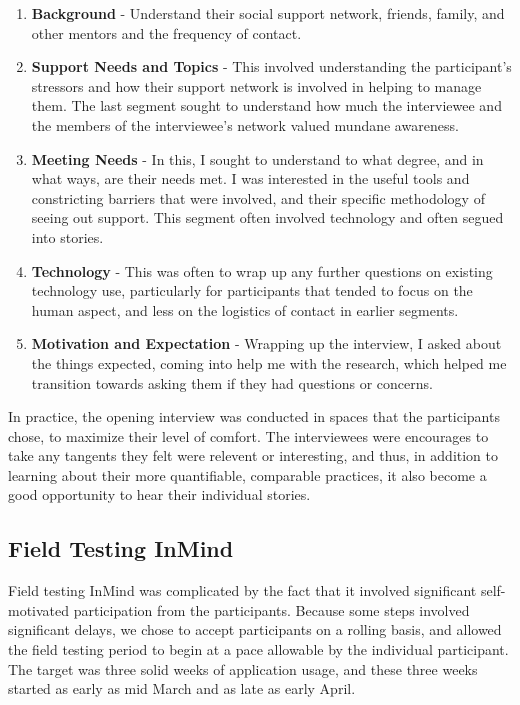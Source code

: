   \begin{enumerate}
  \item \textbf{Background} -
    Understand their social support network,
    friends, family, and other mentors and the frequency of contact.

  \item \textbf{Support Needs and Topics} -
    This involved understanding the participant's stressors and how their
    support network is involved in helping to manage them.
    The last segment sought to understand how much the interviewee
    and the members of the interviewee's network valued
    mundane awareness.

  \item \textbf{Meeting Needs} -
    In this, I sought to understand to what degree,
    and in what ways, are their needs met.
    I was interested in the useful tools and constricting barriers
    that were involved,
    and their specific methodology of seeing out support.
    This segment often involved technology and often segued into stories.

  \item \textbf{Technology} -
    This was often to wrap up any further questions on existing technology use,
    particularly for participants that tended to focus on the human aspect,
    and less on the logistics of contact in earlier segments.

  \item \textbf{Motivation and Expectation} - 
    Wrapping up the interview, I asked about the things expected,
    coming into help me with the research,
    which helped me transition towards asking them if they had questions
    or concerns.
  \end{enumerate}

  In practice, the opening interview was conducted in spaces
  that the participants chose, to maximize their level of comfort.
  The interviewees were encourages to take any tangents they felt
  were relevent or interesting, and thus,
  in addition to learning about their more quantifiable, comparable practices,
  it also become a good opportunity to hear their individual stories.

  \subsection{Field Testing InMind}
  Field testing InMind was complicated by the fact that it involved
  significant self-motivated participation from the participants.
  Because some steps involved significant delays,
  we chose to accept participants on a rolling basis,
  and allowed the field testing period to begin at a pace allowable
  by the individual participant.
  The target was three solid weeks of application usage,
  and these three weeks started as early as mid March
  and as late as early April.
  
